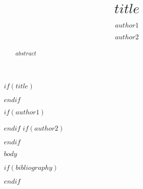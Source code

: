 \documentclass{josis}
\begin{document}


$if(title)$
\title{$title$}
$endif$

$if(author1)$
\author{$author1$}
$endif$
$if(author2)$
\author{$author2$}
$endif$

\maketitle


\begin{abstract}
$abstract$
\end{abstract}

$body$

$if(bibliography)$


$endif$
\end{document}
